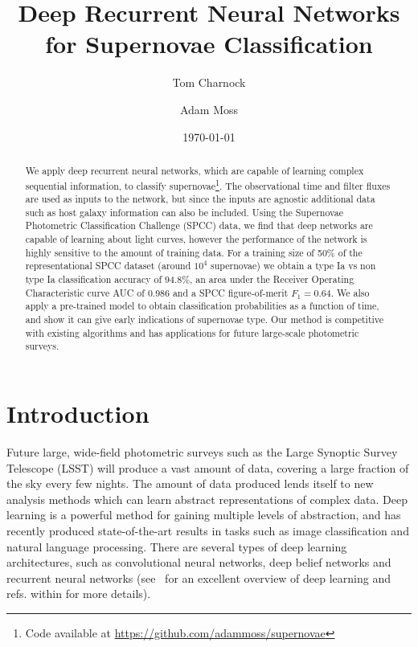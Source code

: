 \documentclass[nofootinbib,amsmath,amssymb,10pt,eqsecnum, twocolumn]{revtex4-1}
\begin{document}
\title{Deep Recurrent Neural Networks for Supernovae Classification}

\author{Tom Charnock} 

\author{Adam Moss} 

\date{\today}

\begin{abstract}
   We apply deep recurrent neural networks, which are capable of learning complex sequential information, to classify supernovae\footnote{Code available at \href{https://github.com/adammoss/supernovae}{https://github.com/adammoss/supernovae}}. The observational time and  filter fluxes are used as inputs to the network, but since the inputs are agnostic additional data such as host galaxy information can also be included. Using the Supernovae Photometric Classification Challenge (SPCC) data, we find that deep networks are capable of learning about light curves, however the performance of the network is highly sensitive to the amount of training data.  For a training size of 50\% of the representational SPCC dataset (around $10^4$ supernovae) we obtain a type Ia vs non type Ia classification accuracy of 94.8\%, an area under the Receiver Operating Characteristic curve AUC of 0.986 and a SPCC figure-of-merit $F_1=0.64$. We also apply a pre-trained model to obtain classification probabilities as a function of time, and show it can give early indications of supernovae type. Our method is competitive with existing algorithms and has applications for future large-scale photometric surveys. 
   \end{abstract}

\maketitle

\section{Introduction}

Future large, wide-field photometric surveys such as the Large Synoptic	Survey Telescope (LSST) will produce a vast amount of data, covering a large fraction of the sky every few nights. The amount of data produced lends itself to new analysis methods which can learn abstract representations of complex data. Deep learning is a powerful method for gaining multiple levels of abstraction, and has recently produced state-of-the-art results in tasks such as image classification and natural language processing. There are several types of deep learning architectures, such as convolutional neural networks, deep belief networks and recurrent neural networks (see~\cite{0483bd9444a348c8b59d54a190839ec9} for an excellent overview of deep learning and refs. within for more details).
\end{document}
